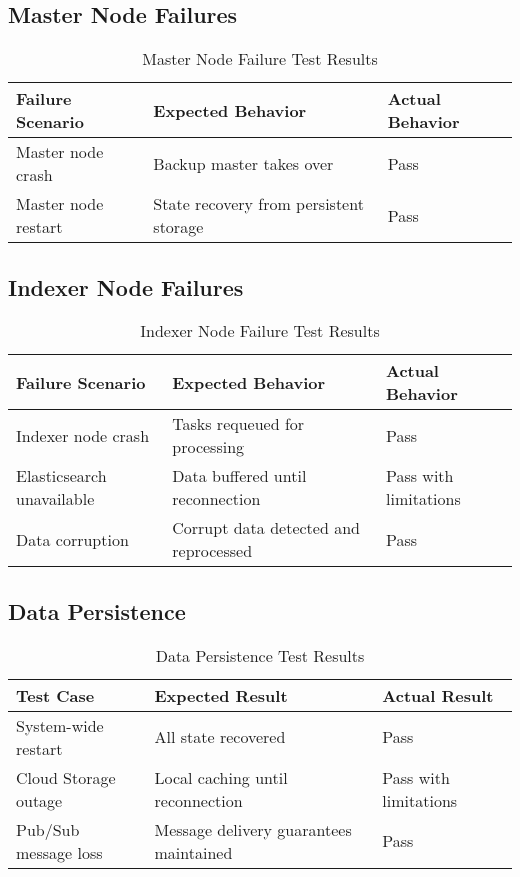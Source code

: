 \documentclass[12pt,a4paper]{report}
\begin{document}
\subsection{Master Node Failures}
\begin{table}[H]
    \centering
    \begin{tabularx}{\textwidth}{|X|X|X|}
        \hline
        \textbf{Failure Scenario} & \textbf{Expected Behavior} & \textbf{Actual Behavior} \\
        \hline
        Master node crash & Backup master takes over & Pass \\
        \hline
        Master node restart & State recovery from persistent storage & Pass \\
        \hline
    \end{tabularx}
    \caption{Master Node Failure Test Results}
\end{table}

\subsection{Indexer Node Failures}
\begin{table}[H]
    \centering
    \begin{tabularx}{\textwidth}{|X|X|X|}
        \hline
        \textbf{Failure Scenario} & \textbf{Expected Behavior} & \textbf{Actual Behavior} \\
        \hline
        Indexer node crash & Tasks requeued for processing & Pass \\
        \hline
        Elasticsearch unavailable & Data buffered until reconnection & Pass with limitations \\
        \hline
        Data corruption & Corrupt data detected and reprocessed & Pass \\
        \hline
    \end{tabularx}
    \caption{Indexer Node Failure Test Results}
\end{table}

\subsection{Data Persistence}
\begin{table}[H]
    \centering
    \begin{tabularx}{\textwidth}{|X|X|X|}
        \hline
        \textbf{Test Case} & \textbf{Expected Result} & \textbf{Actual Result} \\
        \hline
        System-wide restart & All state recovered & Pass \\
        \hline
        Cloud Storage outage & Local caching until reconnection & Pass with limitations \\
        \hline
        Pub/Sub message loss & Message delivery guarantees maintained & Pass \\
        \hline
    \end{tabularx}
    \caption{Data Persistence Test Results}
\end{table}
\end{document}
